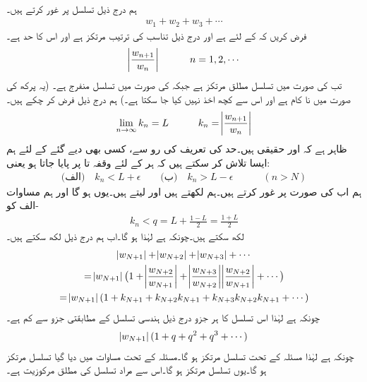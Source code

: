 \quad {}\\
ہم درج ذیل تسلسل پر غور کرتے ہیں۔
\begin{align*}
w_1+w_2+w_3+\cdots
\end{align*}
فرض کریں کہ  کے لئے  ہے اور درج ذیل تناسب کی ترتیب مرتکز ہے اور اس  کا حد  ہے۔
\begin{align*}
\abs{\frac{w_{n+1}}{w_n}}\quad \quad \quad n=1,2,\cdots
\end{align*}
تب  کی صورت میں تسلسل مطلق مرتکز ہے جبکہ  کی صورت میں تسلسل منفرج ہے۔ (یہ پرکھ  کی صورت میں نا کام ہے اور اس سے کچھ اخذ نہیں کیا جا سکتا ہے۔)
\quad
ہم درج ذیل فرض کر چکے ہیں۔
\begin{align*}
\lim_{n\to\infty} k_n=L \quad \quad \quad k_n=\abs{\frac{w_{n+1}}{w_n}}
\end{align*}
ظاہر ہے کہ  اور  حقیقی ہیں۔حد کی تعریف کی رو سے، کسی بھی دیے گئے  کے لئے ہم ایسا  تلاش کر سکتے ہیں کہ ہر  کے لئے  وقفہ  تا  پر پایا جاتا ہو یعنی:
\begin{align}\label{مساوات_ترتیب_نسبت_الف}
\text{(الف)}\quad k_n<L+\epsilon \quad \quad \text{(ب)}\quad k_n>L-\epsilon\quad \quad \quad (n>N)
\end{align}
ہم اب  کی صورت پر غور کرتے ہیں۔ہم  لکھتے ہیں اور  لیتے ہیں۔یوں  ہو گا اور ہم  مساوات -الف کو
\begin{align*}
k_n<q=L+\frac{1-L}{2}=\frac{1+L}{2}
\end{align*}
لکھ سکتے ہیں۔چونکہ  ہے لہٰذا  ہو گا۔اب ہم درج ذیل لکھ سکتے ہیں۔
\begin{multline}\label{مساوات_ترتیب_نسبت_ب}
\abs{w_{N+1}}+\abs{w_{N+2}}+\abs{w_{N+3}}+\cdots\\
=\abs{w_{N+1}}\big(1+\abs{\frac{w_{N+2}}{w_{N+1}}}+\abs{\frac{w_{N+3}}{w_{N+2}}}\abs{\frac{w_{N+2}}{w_{N+1}}}+\cdots\big)\\
=\abs{w_{N+1}}(1+k_{N+1}+k_{N+2}k_{N+1}+k_{N+3}k_{N+2}k_{N+1}+\cdots)
\end{multline}
چونکہ  ہے لہٰذا اس تسلسل کا ہر جزو درج ذیل ہندسی تسلسل کے مطابقتی جزو سے کم ہے۔
\begin{align*}
\abs{w_{N+1}}(1+q+q^2+q^3+\cdots)
\end{align*}
چونکہ  ہے لہٰذا مسئلہ  کے تحت تسلسل مرتکز ہو گا۔مسئلہ  کے تحت  مساوات  میں دیا گیا تسلسل مرتکز ہو گا۔یوں تسلسل  مرتکز ہو گا۔اس سے مراد تسلسل  کی مطلق مرکوزیت ہے۔

